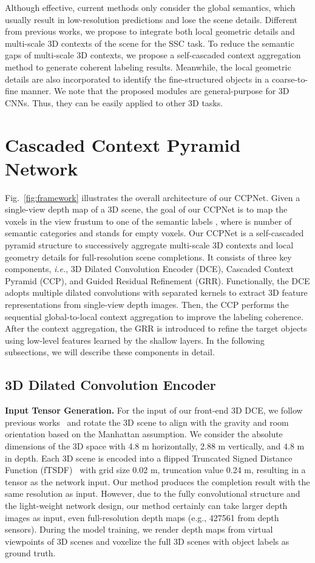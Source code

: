 \documentclass[10pt,twocolumn,letterpaper]{article}
\begin{document}
Although effective, current methods only consider the global semantics, which usually result in low-resolution predictions and lose the scene details.
Different from previous works, we propose to integrate both local geometric details and multi-scale 3D contexts of the scene for the SSC task.
To reduce the semantic gaps of multi-scale 3D contexts, we propose a self-cascaded context aggregation method to generate coherent labeling results.
Meanwhile, the local geometric details are also incorporated to identify the fine-structured objects in a coarse-to-fine manner.
We note that the proposed modules are general-purpose for 3D CNNs.
Thus, they can be easily applied to other 3D tasks.
\section{Cascaded Context Pyramid Network}
Fig.~\ref{fig:framework} illustrates the overall architecture of our CCPNet.
Given a single-view depth map of a 3D scene, the goal of our CCPNet is to map the voxels in the view frustum to one of the semantic labels , where  is number of semantic categories and  stands for empty voxels.
Our CCPNet is a self-cascaded pyramid structure to successively aggregate multi-scale 3D contexts and local geometry details for full-resolution scene completions.
It consists of three key components, \emph{i.e.}, 3D Dilated Convolution Encoder (DCE),
Cascaded Context Pyramid (CCP), and Guided Residual Refinement (GRR).
Functionally, the DCE adopts multiple dilated convolutions with separated kernels to extract 3D feature representations from single-view depth images.
Then, the CCP performs the sequential global-to-local context aggregation to improve the labeling coherence.
After the context aggregation, the GRR is introduced to refine the target objects using low-level features learned by the shallow layers.
In the following subsections, we will describe these components in detail.
\subsection{3D Dilated Convolution Encoder}
\textbf{Input Tensor Generation.}
For the input of our front-end 3D DCE, we follow previous works~\cite{song2017semantic,garbade2018two,guo2018view} and rotate the 3D scene to align with the gravity and room orientation based on the Manhattan assumption.
We consider the absolute dimensions of the 3D space with 4.8 m horizontally, 2.88 m vertically, and 4.8 m in depth.
Each 3D scene is encoded into a flipped Truncated Signed Distance Function (fTSDF)~\cite{song2017semantic} with grid size 0.02 m, truncation value 0.24 m, resulting in a  tensor as the network input.
Our method produces the completion result with the same resolution as input.
However, due to the fully convolutional structure and the light-weight network design, our method certainly can take larger depth images as input, even full-resolution depth maps (e.g., 427561 from depth sensors).
During the model training, we render depth maps from virtual viewpoints of 3D scenes and voxelize the full 3D scenes with object labels as ground truth.
\end{document}
